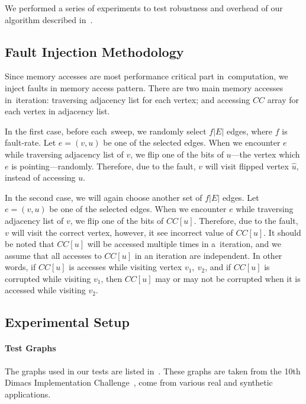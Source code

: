 We performed a series of experiments to test robustness and overhead of our algorithm described in~. 

\subsection{Fault Injection Methodology}
Since memory accesses are most performance critical part in~\sv computation, we inject faults in memory access pattern. There are two main memory accesses in~\sv iteration: traversing adjacency list for each vertex; and 
accessing $CC$ array for each vertex in adjacency list. 


In the first case, before each~\sv sweep, we randomly select $f|E|$ edges, where $f$ is fault-rate. Let $e=(v,u)$ be  one of the selected edges. When we encounter $e$ while traversing adjacency list of $v$, we flip one of the bits of $u$---the vertex which $e$ is pointing---randomly. 
Therefore, due to the fault, $v$ will visit flipped vertex $\hat{u}$, instead of accessing $u$. 

In the second case, we will again choose another set of $f|E|$ edges. Let $e=(v,u)$ be  one of the selected edges. When we encounter $e$ while traversing adjacency list of $v$, we flip one of the bits of $CC[u]$.
Therefore, due to the fault, $v$ will visit the correct vertex, however, it see incorrect value of  $CC[u]$.
It should be noted that $CC[u]$ will be accessed multiple times in a~\sv iteration, and we assume that 
all accesses to $CC[u]$ in an iteration are independent. In other words, if $CC[u]$ is accesses while visiting 
vertex $v_{1},\ v_{2}$, and if $CC[u]$ is corrupted while visiting $v_{1}$, then $CC[u]$ may or may not be corrupted when it is accessed while visiting $v_{2}$.


\subsection{Experimental Setup}


\paragraph{Test Graphs}
The graphs used in our tests are listed in~. 
These graphs are taken from the 10th Dimacs Implementation Challenge~\cite{Bader-dimacs-graph2014}, come from various real and synthetic applications. 


